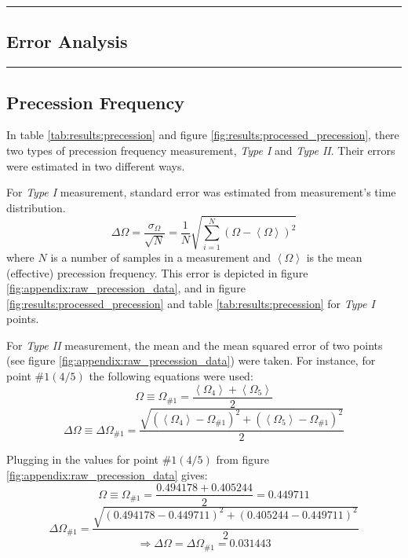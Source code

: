 {\color{gray}\hrule}
\begin{center}
\section{Error Analysis} \label{appendix:errors}
\bigskip
\end{center}
{\color{gray}\hrule}

\begin{multicols}{2}
\subsection{Precession Frequency}
\label{appendix:errors:precession_frequency}

In table \ref{tab:results:precession} and figure \ref{fig:results:processed_precession}, there two types of precession frequency measurement, \emph{Type I} and \emph{Type II}. Their errors were estimated in two different ways.

For \emph{Type I} measurement, standard error was estimated from measurement's time distribution.
\begin{equation*}
  \Delta\Omega = \frac{\sigma_{\Omega}}{\sqrt{N}} = \frac{1}{N}\sqrt{\sum\limits_{i=1}^N(\Omega - \left<\Omega\right>)^2}
\end{equation*}
where $N$ is a number of samples in a measurement and $\left< \Omega \right>$ is the mean (effective) precession frequency. This error is depicted in figure \ref{fig:appendix:raw_precession_data}, and in figure \ref{fig:results:processed_precession} and table \ref{tab:results:precession} for \emph{Type I} points.

For \emph{Type II} measurement, the mean and the mean squared error of two points (see figure \ref{fig:appendix:raw_precession_data}) were taken. For instance, for point $\#1 (4/5)$ the following equations were used:
\begin{equation*}
  \Omega \equiv \Omega_{\#1} = \frac{\left< \Omega_{4} \right> + \left< \Omega_{5} \right>}{2}
\end{equation*}
\begin{equation*}
  \Delta\Omega \equiv \Delta\Omega_{\#1} = \frac{\sqrt{(\left< \Omega_{4} \right> - \Omega_{\#1})^{2} + (\left< \Omega_{5} \right> - \Omega_{\#1})^{2}}}{2}
\end{equation*}

Plugging in the values for point $\#1 (4/5)$ from figure \ref{fig:appendix:raw_precession_data} gives:
\begin{equation*}
  \Omega \equiv \Omega_{\#1} = \frac{0.494178 + 0.405244}{2} = 0.449711
\end{equation*}
\begin{equation*}
  \Delta\Omega_{\#1} = \frac{\sqrt{(0.494178 - 0.449711)^{2} + (0.405244 - 0.449711)^{2}}}{2}
\end{equation*}
\begin{equation*}
  \Rightarrow \Delta \Omega = \Delta \Omega_{\#1} = 0.031443
\end{equation*}


\end{multicols}
